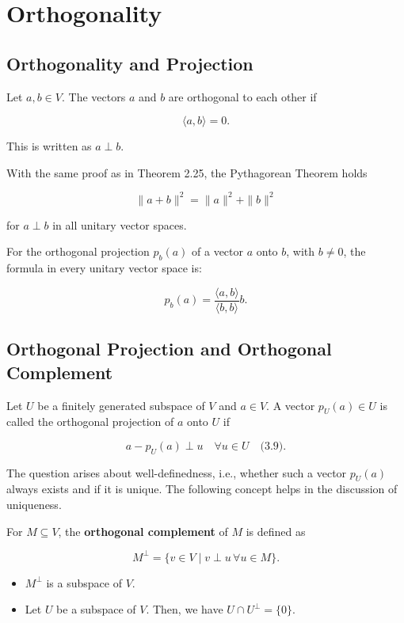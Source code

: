 \section{Orthogonality}

\subsection{Orthogonality and Projection}

Let \( a, b \in V \). The vectors \( a \) and \( b \) are orthogonal to each other if

\[
\langle a, b \rangle = 0.
\]

This is written as \( a \perp b \).

With the same proof as in Theorem 2.25, the Pythagorean Theorem holds

\[
\|a + b\|^2 = \|a\|^2 + \|b\|^2
\]

for \( a \perp b \) in all unitary vector spaces.

For the orthogonal projection \( p_b(a) \) of a vector \( a \) onto \( b \), with \( b \neq 0 \), the formula in every unitary vector space is:

\[
p_b(a) = \frac{\langle a, b \rangle}{\langle b, b \rangle} b.
\]

\subsection{Orthogonal Projection and Orthogonal Complement}

Let \( U \) be a finitely generated subspace of \( V \) and \( a \in V \). A vector \( p_U(a) \in U \) is called the orthogonal projection of \( a \) onto \( U \) if

\[
a - p_U(a) \perp u \quad \forall u \in U \quad \text{(3.9)}.
\]

The question arises about well-definedness, i.e., whether such a vector \( p_U(a) \) always exists and if it is unique. The following concept helps in the discussion of uniqueness.

For \( M \subseteq V \), the \textbf{orthogonal complement} of \( M \) is defined as

\[
M^\perp = \{ v \in V \mid v \perp u \, \forall u \in M \}.
\]

\begin{itemize}[label=\(-\)]
    \item \( M^\perp \) is a subspace of \( V \).
    \item Let \( U \) be a subspace of \( V \). Then, we have \( U \cap U^\perp = \{0\} \).
\end{itemize}

